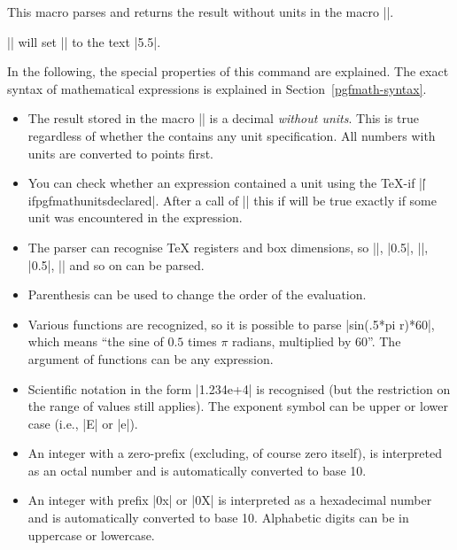 \begin{command}{\pgfmathparse{}}
  This macro parses  and returns the result without
  units in  the macro |\pgfmathresult|.

  \example |\pgfmathparse{2pt+3.5pt}| will set |\pgfmathresult| to the
  text |5.5|.

  In the following, the special properties of this command are
  explained. The exact syntax of mathematical expressions is explained
  in Section~\ref{pgfmath-syntax}.

  \begin{itemize}
  \item
  The result stored in the macro |\pgfmathresult| is a decimal
  \emph{without units}. This is true regardless of whether the
   contains any unit specification. All numbers
  with units are converted to points first.

  \item
 	You can check whether an expression contained a unit using 
  the \TeX-if |\||ifpgfmathunitsdeclared|. After a call
  of |\pgfmathparse| this if will be true exactly if some unit was
  encountered in the expression.
    
  \item 
  The parser can recognise \TeX{} registers and box dimensions,
  so |\mydimen|, |0.5\mydimen|, |\wd\mybox|, |0.5\dp\mybox|, 
  |\mycount\mydimen| and so on can be parsed.

  \item 
  Parenthesis can be used to change the order of the evaluation.

  \item 
  Various functions are recognized, so it is possible to parse
  |sin(.5*pi r)*60|, which means ``the sine of $0.5$ times $\pi$ 
  radians, multiplied by 60''. The argument of functions can
  be any expression.

  \item 
  Scientific notation in the form |1.234e+4| is recognised (but
  the restriction on the range of values still applies). The exponent
  symbol can be upper or lower case (i.e., |E| or |e|). 
  
  \item
  An integer with a zero-prefix (excluding, of course zero itself),
  is interpreted as an octal number and is automatically converted 
  to base 10.
  
  \item
  An integer with prefix |0x| or |0X| is interpreted as a hexadecimal
  number and is automatically converted to base 10. Alphabetic digits
  can be in uppercase or lowercase.
  

\end{itemize}
\end{command}
